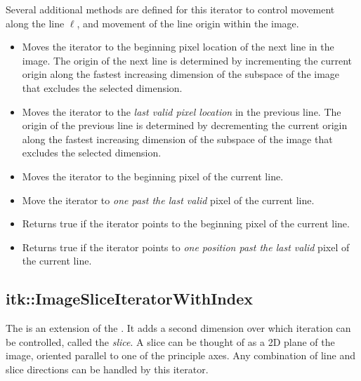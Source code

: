 Several additional methods are defined for this iterator to control movement
along the line $\ell$, and movement of the line origin within the image.


\begin{itemize}
\item \textbf{} Moves the iterator to the beginning pixel
location of the next line in the image.  The origin of the next line is
determined by incrementing the current origin along the fastest increasing
dimension of the subspace of the image that excludes the selected dimension.

\item \textbf{} Moves the iterator to the \emph{last valid
pixel location} in the previous line. The origin of the previous line is
determined by decrementing the current origin along the fastest increasing
dimension of the subspace of the image that excludes the selected dimension.

\item \textbf{} Moves the iterator to the beginning
pixel of the current line.

\item \textbf{}  Move the iterator to \emph{one past
the last valid} pixel of the current line.

\item \textbf{} Returns true if the iterator points
to the beginning pixel of the current line.

\item \textbf{}  Returns true if the iterator points to
\emph{one position past the last valid} pixel of the current line.
\end{itemize}



\subsection{itk::ImageSliceIteratorWithIndex}
\label{sec:itkImageSliceIteratorWithIndex}
The  is an extension of the
.  It adds a second dimension over
which iteration can be controlled, called the \emph{slice}.  A slice can be
thought of as a 2D plane of the image, oriented parallel to one of the
principle axes.  Any combination of line and slice directions can be handled by
this iterator.


